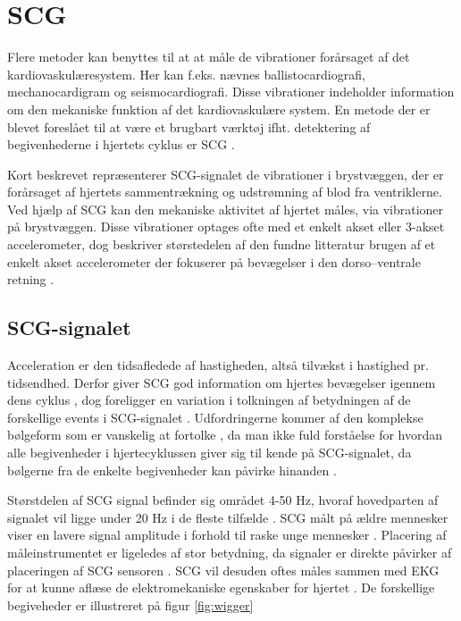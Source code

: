 \section{SCG}
Flere metoder kan benyttes til at at måle de vibrationer forårsaget af det kardiovaskulæresystem. Her kan f.eks. nævnes ballistocardiografi, mechanocardigram og seismocardiografi. Disse vibrationer indeholder information om den mekaniske funktion af det kardiovaskulære system. En metode der er blevet foreslået til at være et brugbart værktøj ifht. detektering af begivenhederne i hjertets cyklus er SCG \cite{phd}. 

Kort beskrevet repræsenterer SCG-signalet de vibrationer i brystvæggen, der er forårsaget af hjertets sammentrækning og udstrømning af blod fra ventriklerne. Ved hjælp af  SCG kan den mekaniske aktivitet af hjertet måles, via vibrationer på brystvæggen. Disse vibrationer optages ofte med et enkelt akset eller 3-akset accelerometer, dog beskriver størstedelen af den fundne litteratur  brugen af et enkelt akset accelerometer der fokuserer på bevægelser i den dorso–ventrale retning \cite{Recent_Advances}.

\subsection{SCG-signalet}
Acceleration er den tidsafledede af hastigheden, altså tilvækst i hastighed pr. tidsendhed. Derfor giver SCG god information om hjertes bevægelser igennem dens cyklus \cite{performance}, dog  foreligger en variation i tolkningen af betydningen af de forskellige events i SCG-signalet \cite{phd}. Udfordringerne kommer af den komplekse bølgeform som er vanskelig at fortolke \cite{zanetti}, da man ikke fuld forståelse for hvordan alle begivenheder i hjertecyklussen giver sig til kende på SCG-signalet, da bølgerne fra de enkelte begivenheder kan påvirke hinanden \cite{abra}.

Størstdelen af SCG signal befinder sig området 4-50 Hz, hvoraf hovedparten af signalet vil ligge under 20 Hz i de fleste tilfælde \cite{phd}. 
SCG målt på ældre mennesker viser en lavere signal amplitude i forhold til raske unge mennesker \cite{Recent_Advances}. Placering af måleinstrumentet er ligeledes af stor betydning, da signaler er direkte påvirker af placeringen af SCG sensoren \cite{zanetti}. SCG vil desuden oftes måles sammen med EKG for at kunne aflæse de elektromekaniske egenskaber for hjertet \cite{abra}. De forskellige begiveheder er illustreret på figur \ref{fig:wigger}


